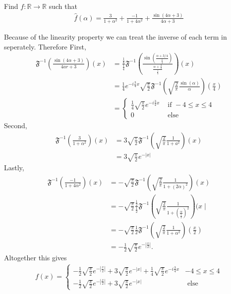 \documentclass[11pt]{article}
\begin{document}
\begin{exercise}
    Find $f : \mathbb R \to \mathbb R$ such that 
    \begin{align*}
        \hat f(\alpha) = \frac{3}{1+\alpha^{2}} + \frac{-1}{1+4\alpha^{2}} + \frac{ \sin( 4 \alpha + 3 ) }{ 4 \alpha + 3 }
    \end{align*}
\end{exercise}
\begin{solution}   Because of the linearity property we can treat the inverse of each term in seperately. Therefore 
    First,
    \begin{align*} 
        \mathfrak{F}^{-1}\left(\frac{\sin (4 \alpha+3)}{4 a r+3}\right)(x) & =\frac{\frac{1}{4}}{\frac{1}{4}} \mathfrak{F}^{-1}\left(\frac{\sin \left(\frac{\alpha+3 / 4}{\frac{1}{4}}\right)}{\frac{\alpha+\frac{3}{4}}{\frac{1}{4}}}\right)(x) \\ & =\frac{1}{4} e^{-i \frac{3}{4} x} \sqrt{\frac{\pi}{2}} \mathfrak{F}^{-1}\left(\sqrt{\frac{2}{\pi}} \frac{\sin (\alpha)}{\alpha}\right)\left(\frac{x}{4}\right) \\ & = \begin{cases}\frac{1}{4} \sqrt{\frac{\pi}{2}} e^{-i \frac{3}{4} x} & \text { if }-4 \leq x \leq 4 \\ 0 & \text { else }\end{cases} 
    \end{align*}
    Second,
    \begin{align*} 
        \mathfrak{F}^{-1}\left(\frac{3}{1+\alpha^2}\right)(x) & =3 \sqrt{\frac{\pi}{2}} \mathfrak{F}^{-1}\left(\sqrt{\frac{2}{\pi}} \frac{1}{1+a^2}\right)(x) \\ & =3 \sqrt{\frac{\pi}{2}} e^{-|x|}
    \end{align*}
    Lastly,
    \begin{align*} 
        \mathfrak{F}^{-1}\left(\frac{-1}{1+4 \alpha^2}\right)(x) 
        & =
        -\sqrt{\frac{\pi}{2}} \mathfrak{F}^{-1}\left(\sqrt{\frac{2}{\pi}} \frac{1}{1+(2 \alpha)^2}\right)(x) 
        \\ & 
        =
        -\sqrt{\frac{\pi}{2}} \frac{\frac{1}{2}}{\frac{1}{2}} \mathfrak{F}^{-1}\left(\sqrt{\frac{2}{\pi}} \frac{1}{1+\left(\frac{\alpha}{\frac{1}{2}}\right)^2}\right)(x \mid 
        \\ &
        =
        -\sqrt{\frac{\pi}{2}} \frac{1}{2} \mathfrak{F}^{-1}\left(\sqrt{\frac{2}{\pi}} \frac{1}{1+\alpha^2}\right)\left(\frac{x}{2}\right) 
        \\ & 
        =
        -\frac{1}{2} \sqrt{\frac{\pi}{2}} e^{-\left|\frac{x}{2}\right|}
        .
    \end{align*}
    Altogether this gives
    \begin{align*} 
        f(x) = \begin{cases}-\frac{1}{2} \sqrt{\frac{\pi}{2}} e^{-\left|\frac{x}{2}\right|}+3 \sqrt{\frac{\pi}{2}} e^{-|x|}+\frac{1}{4} \sqrt{\frac{\pi}{2}} e^{-i \frac{3}{4} x} & -4 \leq x \leq 4 \\ -\frac{1}{2} \sqrt{\frac{\pi}{2}} e^{-\left|\frac{x}{2}\right|}+3 \sqrt{\frac{\pi}{2}} e^{-|x|} & \text { else }\end{cases}
    \end{align*}
    

\end{solution}
\end{document}
